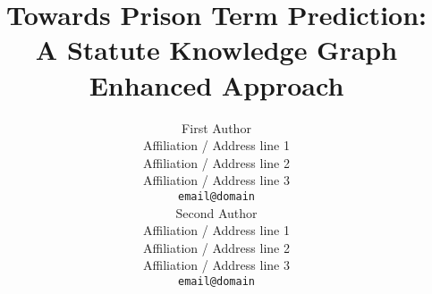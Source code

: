 \documentclass[11pt]{article}
\title{Towards Prison Term Prediction: A Statute Knowledge Graph Enhanced Approach}
\author{First Author \\
  Affiliation / Address line 1 \\
  Affiliation / Address line 2 \\
  Affiliation / Address line 3 \\
  \texttt{email@domain} \\\And
  Second Author \\
  Affiliation / Address line 1 \\
  Affiliation / Address line 2 \\
  Affiliation / Address line 3 \\
  \texttt{email@domain} \\}
\begin{document}
\maketitle
\begin{abstract}

\end{abstract}










%


\appendix
% 
% 





\end{document}
